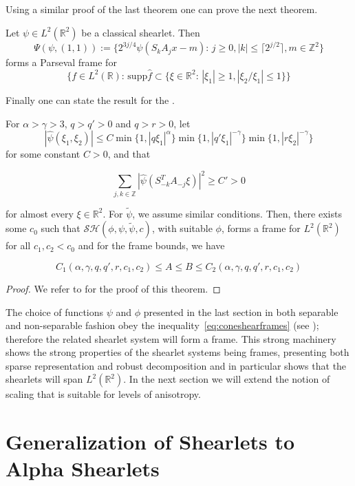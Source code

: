 Using a similar proof of the last theorem one can prove the next theorem.

\begin{thm}
Let $\psi\in L^2(\mathbb{R}^2)$ be a classical shearlet. Then 
$$
\Psi(\psi,(1,1)):=\{2^{3j/4}\psi(S_kA_jx-m)\text{: }j\geq 0,|k|\leq\lceil 2^{j/2}\rceil,m\in\mathbb{Z}^2\}
$$
forms a Parseval frame for 
$$
\{f\in L^2(\mathbb{R})\text{:  supp}\hat{f}\subset\{\xi\in\mathbb{R}^2\text{:  }|\xi_1|\geq 1,|\xi_2/\xi_1|\leq 1\}\}
$$
\end{thm}

Finally one can state the result for the .

\begin{thm}
For $\alpha >\gamma>3$, $q>q'>0$ and $q>r>0$, let 
\begin{equation}
\label{eq:coneshearframes}
|\hat{\psi}(\xi_1,\xi_2)|\leq C\min\{1,|q\xi_1|^{\alpha}\}\min\{1,|q'\xi_1|^{-\gamma}\}\min\{1,|r\xi_2|^{-\gamma}\}
\end{equation}
for some constant $C>0$, and that

$$
\sum_{j,k\in\mathbb{Z}}|\hat{\psi}(S^T_{-k}A_{-j}\xi)|^2\geq C'>0
$$

for almost every $\xi\in\mathbb{R}^2$. For $\tilde{\psi}$, we assume similar conditions. Then, there exists some $c_0$ such that $\mathcal{SH}(\phi,\psi,\tilde{\psi},c)$, with suitable $\phi$, forms a frame for $L^2(\mathbb{R}^2)$ for all $c_1,c_2<c_0$ and for the frame bounds, we have 

$$
C_1(\alpha,\gamma,q,q',r,c_1,c_2)\leq A\leq B\leq C_2(\alpha,\gamma,q,q',r,c_1,c_2)
$$

\end{thm}
\begin{proof}
We refer to \cite{FirstShearlets} for the proof of this theorem. 
\end{proof}

The choice of functions $\psi$ and $\phi$ presented in the last section in both separable and non-separable fashion obey the inequality~\ref{eq:coneshearframes} (see \cite{Nonseparableshear}); therefore the related shearlet system will form a frame. This strong machinery shows the strong properties of the shearlet systems being frames, presenting both sparse representation and robust decomposition and in particular shows that the shearlets will span $L^2(\mathbb{R}^2)$. In the next section we will extend the notion of scaling that is suitable for levels of anisotropy. 

\section{Generalization of Shearlets to Alpha Shearlets}
\label{sec:AlphaShearlets}

